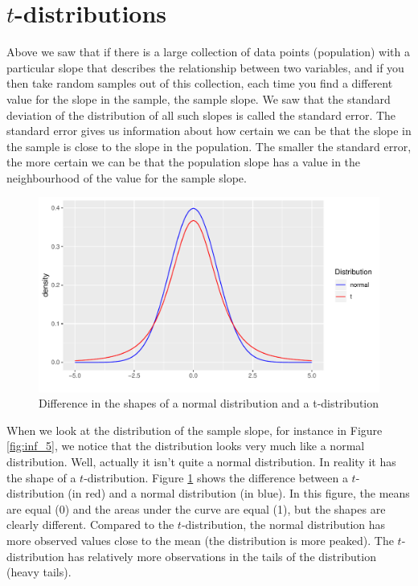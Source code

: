 \documentclass[]{report}\usepackage[]{graphicx}\usepackage[]{color}
\makeatletter
\def\maxwidth{ %
  \ifdim\Gin@nat@width>\linewidth
    \linewidth
  \else
    \Gin@nat@width
  \fi
}
\newenvironment{knitrout}{}{} %
\makeatother
\begin{document}
\section{$t$-distributions}

Above we saw that if there is a large collection of data points (population) with a particular slope that describes the relationship between two variables, and if you then take random samples out of this collection, each time you find a different value for the slope in the sample, the sample slope. We saw that the standard deviation of the distribution of all such slopes is called the standard error. The standard error gives us information about how certain we can be that the slope in the sample is close to the slope in the population. The smaller the standard error, the more certain we can be that the population slope has a value in the neighbourhood of the value for the sample slope.



\begin{knitrout}
\color{fgcolor}\begin{figure}

{\centering \includegraphics[width=\maxwidth]{figure/inf_8-1} 

}

\caption[Difference in the shapes of a normal distribution and a t-distribution]{Difference in the shapes of a normal distribution and a t-distribution}\label{fig:inf_8}
\end{figure}


\end{knitrout}



When we look at the distribution of the sample slope, for instance in Figure \ref{fig:inf_5}, we notice that the distribution looks very much like a normal distribution. Well, actually it isn't quite a normal distribution. In reality it has the shape of a $t$-distribution. Figure \ref{fig:inf_8} shows the difference between a $t$-distribution (in red) and a normal distribution (in blue). In this figure, the means are equal (0) and the areas under the curve are equal (1), but the shapes are clearly different. Compared to the $t$-distribution, the normal distribution has more observed values close to the mean (the distribution is more peaked). The $t$-distribution has relatively more observations in the tails of the distribution (heavy tails).
\end{document}
